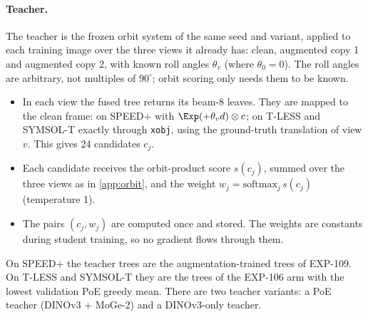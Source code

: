 \paragraph{Teacher.}
The teacher is the frozen orbit system of the same seed and variant, applied to each training image over the three views it already has: clean, augmented copy 1 and augmented copy 2, with known roll angles $\theta_v$ (where $\theta_0=0$). The roll angles are arbitrary, not multiples of $90^\circ$; orbit scoring only needs them to be known.
\begin{itemize}
  \item In each view the fused tree returns its beam-8 leaves. They are mapped to the clean frame: on SPEED+ with $\Exp(+\theta_v d)\otimes c$; on T-LESS and SYMSOL-T exactly through \texttt{xobj}, using the ground-truth translation of view $v$. This gives 24 candidates $c_j$.
  \item Each candidate receives the orbit-product score $s(c_j)$, summed over the three views as in \cref{app:orbit}, and the weight $w_j=\mathrm{softmax}_j\,s(c_j)$ (temperature 1).
  \item The pairs $(c_j,w_j)$ are computed once and stored. The weights are constants during student training, so no gradient flows through them.
\end{itemize}
On SPEED+ the teacher trees are the augmentation-trained trees of EXP-109. On T-LESS and SYMSOL-T they are the trees of the EXP-106 arm with the lowest validation PoE greedy mean. There are two teacher variants: a PoE teacher (DINOv3 + MoGe-2) and a DINOv3-only teacher.

